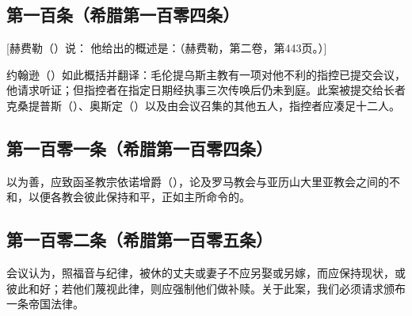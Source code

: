 
\subsection{第一百条（希腊第一百零四条）}

\par

[赫费勒（）说： 他给出的概述是：（赫费勒，第二卷，第443页。）]\par

约翰逊（）如此概括并翻译：毛伦提乌斯主教有一项对他不利的指控已提交会议，他请求听证；但指控者在指定日期经执事三次传唤后仍未到庭。此案被提交给长者克桑提普斯（）、奥斯定（）以及由会议召集的其他五人，指控者应凑足十二人。\par


\subsection{第一百零一条（希腊第一百零四条）}

\par

以为善，应致函圣教宗依诺增爵（），论及罗马教会与亚历山大里亚教会之间的不和，以便各教会彼此保持和平，正如主所命令的。\par


\subsection{第一百零二条（希腊第一百零五条）}

\par

会议认为，照福音与纪律，被休的丈夫或妻子不应另娶或另嫁，而应保持现状，或彼此和好；若他们蔑视此律，则应强制他们做补赎。关于此案，我们必须请求颁布一条帝国法律。\par

